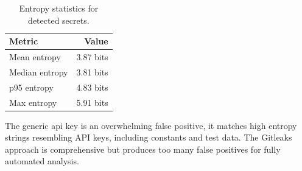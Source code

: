 
\begin{table}[ht]
\centering
\caption{Entropy statistics for detected secrets.}\label{tab:secret-entropy}
\begin{tabular}{|l|r|}
\hline
\textbf{Metric} & \textbf{Value} \\
\hline
Mean entropy   & 3.87 bits \\
Median entropy & 3.81 bits \\
p95 entropy    & 4.83 bits \\
Max entropy    & 5.91 bits \\
\hline
\end{tabular}
\end{table}

The generic api key is an overwhelming false positive, it matches high entropy strings resembling API keys, including constants and test data. The Gitleaks approach is comprehensive but produces too many false positives for fully automated analysis.





